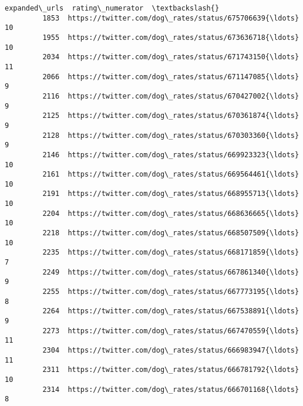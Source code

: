 \documentclass[11pt]{article}
\begin{document}
\begin{Verbatim}[commandchars=\\\{\}]
                                                   expanded\_urls  rating\_numerator  \textbackslash{}
         1853  https://twitter.com/dog\_rates/status/675706639{\ldots}                10   
         1955  https://twitter.com/dog\_rates/status/673636718{\ldots}                10   
         2034  https://twitter.com/dog\_rates/status/671743150{\ldots}                11   
         2066  https://twitter.com/dog\_rates/status/671147085{\ldots}                 9   
         2116  https://twitter.com/dog\_rates/status/670427002{\ldots}                 9   
         2125  https://twitter.com/dog\_rates/status/670361874{\ldots}                 9   
         2128  https://twitter.com/dog\_rates/status/670303360{\ldots}                 9   
         2146  https://twitter.com/dog\_rates/status/669923323{\ldots}                10   
         2161  https://twitter.com/dog\_rates/status/669564461{\ldots}                10   
         2191  https://twitter.com/dog\_rates/status/668955713{\ldots}                10   
         2204  https://twitter.com/dog\_rates/status/668636665{\ldots}                10   
         2218  https://twitter.com/dog\_rates/status/668507509{\ldots}                10   
         2235  https://twitter.com/dog\_rates/status/668171859{\ldots}                 7   
         2249  https://twitter.com/dog\_rates/status/667861340{\ldots}                 9   
         2255  https://twitter.com/dog\_rates/status/667773195{\ldots}                 8   
         2264  https://twitter.com/dog\_rates/status/667538891{\ldots}                 9   
         2273  https://twitter.com/dog\_rates/status/667470559{\ldots}                11   
         2304  https://twitter.com/dog\_rates/status/666983947{\ldots}                11   
         2311  https://twitter.com/dog\_rates/status/666781792{\ldots}                10   
         2314  https://twitter.com/dog\_rates/status/666701168{\ldots}                 8   
         

\end{Verbatim}
\end{document}
